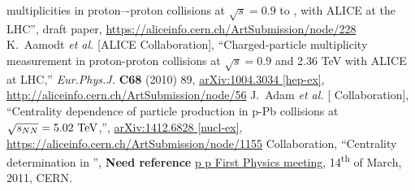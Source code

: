 \begin{thebibliography}{99}
  multiplicities in proton–-proton collisions at $\sqrt{s} = 0.9$ to
  \TeV[8]{}, with ALICE at the LHC'', draft paper,
  \url{https://aliceinfo.cern.ch/ArtSubmission/node/228}
  K.~Aamodt {\it et al.}  [ALICE Collaboration],
  ``Charged-particle multiplicity measurement in proton-proton collisions at $\sqrt{s}=0.9$ and 2.36 TeV with ALICE at LHC,''
  \textit{Eur.Phys.J.} \textbf{C68} (2010) 89, 
  \href{http://arxiv.org/abs/1004.3034}{arXiv:1004.3034 [hep-ex]},
  \url{http://aliceinfo.cern.ch/ArtSubmission/node/56} 
  J.~Adam {\it et al.}  [\ALICE{} Collaboration],
  ``Centrality dependence of particle production in p-Pb collisions at
  $\usNN{pPb}{5023}$,'',
  \href{http://arxiv.org/abs/1412.6828}{arXiv:1412.6828 [nucl-ex]}, 
  \url{https://aliceinfo.cern.ch/ArtSubmission/node/1155}
  \ALICE{} Collaboration, ``Centrality determination in \PbPbCol{}'',
  \textbf{{\color{alicered} Need reference}}
  \href{https://indico.cern.ch/event/118958/}{p p First Physics
    meeting}, 14\textsuperscript{th} of March, 2011, CERN. 
\end{thebibliography}
